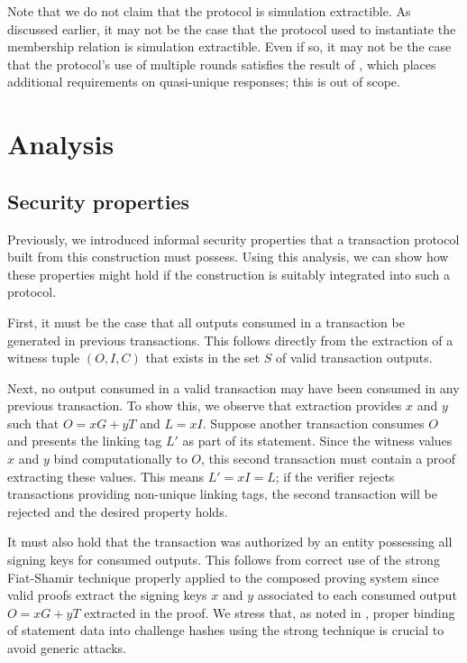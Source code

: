 \documentclass{article}
\theoremstyle{definition}
\begin{document}
Note that we do not claim that the protocol is simulation extractible.
As discussed earlier, it may not be the case that the protocol used to instantiate the membership relation is simulation extractible.
Even if so, it may not be the case that the protocol's use of multiple rounds satisfies the result of \cite{bp_rom}, which places additional requirements on quasi-unique responses; this is out of scope.


\section{Analysis}


\subsection{Security properties}

Previously, we introduced informal security properties that a transaction protocol built from this construction must possess.
Using this analysis, we can show how these properties might hold if the construction is suitably integrated into such a protocol.

First, it must be the case that all outputs consumed in a transaction be generated in previous transactions.
This follows directly from the extraction of a witness tuple $(O, I, C)$ that exists in the set $S$ of valid transaction outputs.

Next, no output consumed in a valid transaction may have been consumed in any previous transaction.
To show this, we observe that extraction provides $x$ and $y$ such that $O = x G + y T$ and $L = x I$.
Suppose another transaction consumes $O$ and presents the linking tag $L'$ as part of its statement.
Since the witness values $x$ and $y$ bind computationally to $O$, this second transaction must contain a proof extracting these values.
This means $L' = x I = L$; if the verifier rejects transactions providing non-unique linking tags, the second transaction will be rejected and the desired property holds.

It must also hold that the transaction was authorized by an entity possessing all signing keys for consumed outputs.
This follows from correct use of the strong Fiat-Shamir technique properly applied to the composed proving system since valid proofs extract the signing keys $x$ and $y$ associated to each consumed output $O = x G + y T$ extracted in the proof.
We stress that, as noted in \cite{fs}, proper binding of statement data into challenge hashes using the strong technique is crucial to avoid generic attacks.
\end{document}

